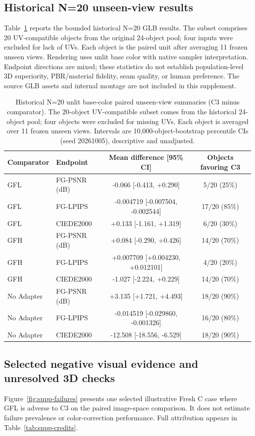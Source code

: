 \documentclass[11pt]{article}
\begin{document}
\subsection*{Historical N=20 unseen-view results}
Table~\ref{tab:supp-n20} reports the bounded historical N=20 GLB results. The subset comprises 20 UV-compatible objects from the original 24-object pool; four inputs were excluded for lack of UVs. Each object is the paired unit after averaging 11 frozen unseen views. Rendering uses unlit base color with native sampler interpretation. Endpoint directions are mixed; these statistics do not establish population-level 3D superiority, PBR/material fidelity, seam quality, or human preference. The source GLB assets and internal montage are not included in this supplement.
\begin{table}[ht]
\centering\small
\caption{Historical N=20 unlit base-color paired unseen-view summaries (C3 minus comparator). The 20-object UV-compatible subset comes from the historical 24-object pool; four objects were excluded for missing UVs. Each object is averaged over 11 frozen unseen views. Intervals are 10,000-object-bootstrap percentile CIs (seed 20261005), descriptive and unadjusted.}\label{tab:supp-n20}
\begin{tabular}{llcc}\toprule Comparator & Endpoint & Mean difference [95\% CI] & Objects favoring C3 \\\midrule
GFL & FG-PSNR (dB) & -0.066 [-0.413, +0.290] & 5/20 (25\%) \\
GFL & FG-LPIPS & -0.004719 [-0.007504, -0.002544] & 17/20 (85\%) \\
GFL & CIEDE2000 & +0.133 [-1.161, +1.319] & 6/20 (30\%) \\
GFH & FG-PSNR (dB) & +0.084 [-0.290, +0.426] & 14/20 (70\%) \\
GFH & FG-LPIPS & +0.007709 [+0.004230, +0.012101] & 4/20 (20\%) \\
GFH & CIEDE2000 & -1.027 [-2.224, +0.229] & 14/20 (70\%) \\
No Adapter & FG-PSNR (dB) & +3.135 [+1.721, +4.493] & 18/20 (90\%) \\
No Adapter & FG-LPIPS & -0.014519 [-0.029860, -0.001326] & 16/20 (80\%) \\
No Adapter & CIEDE2000 & -12.508 [-18.556, -6.529] & 18/20 (90\%) \\
\bottomrule\end{tabular}
\end{table}

\subsection*{Selected negative visual evidence and unresolved 3D checks}
Figure~\ref{fig:supp-failures} presents one selected illustrative Fresh C case where GFL is adverse to C3 on the paired image-space comparison. It does not estimate failure prevalence or color-correction performance. Full attribution appears in Table~\ref{tab:supp-credits}.
\end{document}
